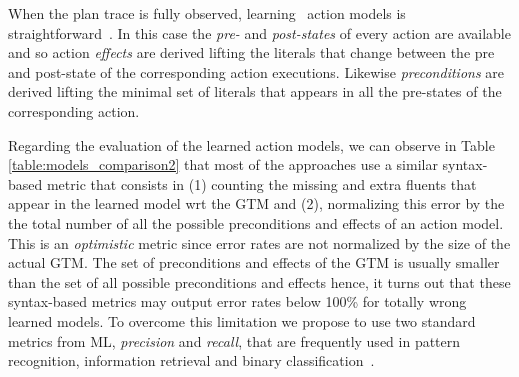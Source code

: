 When the plan trace is fully observed, learning \strips\ action models is straightforward~\cite{jimenez2012review}. In this case the {\em pre-} and {\em post-states} of every action are available and so action {\em effects} are derived lifting the literals that change between the pre and post-state of the corresponding action executions. Likewise {\em preconditions} are derived lifting the minimal set of literals that appears in all the pre-states of the corresponding action.





\vspace{0.1cm}
Regarding the evaluation of the learned action models, we can observe in Table \ref{table:models_comparison2} that most of the approaches use a similar syntax-based metric that consists in (1) counting the missing and extra fluents that appear in the learned model wrt the GTM and (2), normalizing this error by the the total number of all the possible preconditions and effects of an action model. This is an \emph{optimistic} metric since error rates are not normalized by the size of the actual GTM. The set of preconditions and effects of the GTM is usually smaller than the set of all possible preconditions and effects hence, it turns out that these syntax-based metrics may output error rates below 100\% for totally wrong learned models. To overcome this limitation we propose to use two standard metrics from ML, {\em precision} and {\em recall}, that are frequently used in pattern recognition, information retrieval and binary classification~\cite{davis2006relationship}. %

